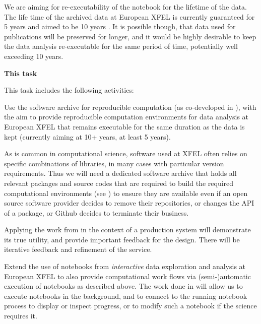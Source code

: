 \begin{task}[
  title=Reproducible photon science workflows at European XFEL,
  id=reproducibility-xfel,
  lead=XFEL,
  PM=36,
  wphases={7-48},
  partners={INSERM,SRL,UPSUD}
  ]
  We are aiming for re-executability of the notebook for the lifetime
  of the data. The life time of the archived data at European XFEL is
  currently guaranteed for 5 years and aimed to be 10 years
  \cite{EuXFEL-datapolicy-2017}. It is possible though, that data used
  for publications will be preserved for longer, and it would be
  highly desirable to keep the data analysis re-executable for the
  same period of time, potentially well exceeding 10 years.

  \medskip \textbf{This task}

  This task includes the following activities:
  \begin{compactitem}
  \item Use the software archive for reproducible computation
    (as co-developed in ), with
    the aim to provide reproducible computation environments for data analysis at
    European XFEL that remains executable for the same duration as the
    data is kept (currently aiming at 10+ years, at least 5 years).

    As is common in computational science, software used at XFEL often
    relies on specific combinations of libraries, in many cases with
    particular version requirements. Thus we will need a dedicated
    software archive that holds all relevant packages and source codes
    that are required to build the required computational environments
    (see ) to ensure they are
    available even if an open source software provider decides to
    remove their repositories, or changes the API of a package, or
    Github decides to terminate their business.

    Applying the work from  in the
    context of a production system will demonstrate its true utility,
    and provide important feedback for the design. There will be
    iterative feedback and refinement of the service.

  \item Extend the use of notebooks from \emph{interactive} data
    exploration and analysis at European XFEL to also provide
    computational work flows via (semi-)automatic execution of
    notebooks as described above. The work done in
     will allow us to execute notebooks in
    the background, and to connect to the running notebook process to
    display or inspect progress, or to modify such a notebook if the
    science requires it.


\end{compactitem}
\end{task}
